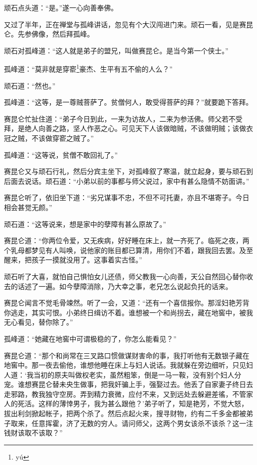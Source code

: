 \documentclass[a4paper,12pt,UTF8,twoside]{ctexbook}
\begin{document}
顽石点头道：“是。”遂一心向善奉佛。

又过了半年，正在禅堂与孤峰讲话，忽见有个大汉闯进门来。顽石一看，见是赛昆仑。先参佛像，然后拜孤峰。

顽石对孤峰道：“这人就是弟子的盟兄，叫做赛昆仑。是当今第一个侠士。”

孤峰道：“莫非就是穿窬\footnote{y\'u}豪杰、生平有五不偷的人么？”

顽石道：“然也。”

孤峰道：“这等，是一尊贼菩萨了。贫僧何人，敢受得菩萨的拜？”就要跪下答拜。

赛昆仑忙扯住道：“弟子今日到此，一来为访故人，二来为参活佛。师父若不受拜，是绝人向善之路，坚人作恶之心。可见天下人该做暗贼，不该做明贼；该做衣冠之贼，不该做穿窬之贼了。”

孤峰道：“这等说，贫僧不敢回礼了。”

赛昆仑又与顽石行礼，然后分宾主坐下，对孤峰叙了寒温，就立起身，要与顽石到后面去说话。顽石道：“小弟以前的事都与师父说过，家中有甚么隐情不妨面讲。”

赛昆仑听了，依旧坐下道：“劣兄谋事不忠，不但不可托妻，亦且不堪寄子。今日相会甚觉无颜。”

顽石道：“这等说来，想是家中的孽障有甚么原故了。”

赛昆仑道：“你两位令爱，又无疾病，好好睡在床上，就一齐死了。临死之夜，两个乳母都梦见有人叫唤，说他家的账目都已算清，用你们不着，跟我回去罢。及至醒来，把孩子一摸就没用了。这事着实古怪。”

顽石听了大喜，就怕自己惧怕女儿还债，师父教我一心向善，天公自然回心替你收去的话述了一遍。如今孽障消除，乃大幸之事，老兄怎么说起负托的话来。

赛昆仑闻言不觉毛骨竦然。听了一会，又道：“还有一个喜信报你。那淫妇艳芳背你逃走，其实可恨。小弟终日缉访不着。谁想被一个和尚拐去，藏在地窖中，被我无心看见，替你除了。”

孤峰道：“她藏在地窖中可谓极稳的了，你怎么能看见？”

赛昆仑道：“那个和尚常在三叉路口惯做谋财害命的事，我打听他有无数银子藏在地窖中。那一夜去偷他，谁想他睡在床上与妇人说话。我就躲在旁边细听，只见妇人道：‘我当初的原夫叫做权老实，虽然粗笨，倒是一马一鞍，没有别个妇人分宠。谁想赛昆仑替未央生做事，把我奸骗上手，强娶过去。他丢了自家妻子终日去走邪路，教我独守空房。弄到精力衰微，应付不来，又到远处去躲避差徭，不管家人的死活。这样的薄悻男子，我为甚么跟他？’弟子听了，知是艳芳，不觉大怒，拔出利剑掀起帐子，把两个杀了。然后点起火来，搜寻财物，约有二千多金都被弟子取来，任意挥霍，济了无数的穷人。请问师父，这两个男女该杀不该杀？这一注钱财该取不该取？”
\end{document}
